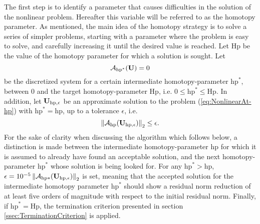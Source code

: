 The first step is to identify a parameter that causes difficulties in the solution of the nonlinear problem. Hereafter this variable will be referred to as the homotopy parameter. 
As mentioned, the main idea of the homotopy strategy is to solve a series of simpler problems, starting with a parameter where the problem is easy to solve, and carefully increasing it until the desired value is reached.  Let  $\mathrm{Hp}$ be the value of the homotopy parameter for which a solution is sought. Let
\begin{equation}
	\mathcal{A}_{\mathrm{hp}^*}(\textbf{U}) = 0
	\label{eq:NonlinearAt-hp}
\end{equation}
be the discretized system for a certain intermediate homotopy-parameter $\mathrm{hp}^*$, between 0 and the target homotopy-parameter $\mathrm{Hp}$, i.e. $0 \leq \mathrm{hp}^* \leq \mathrm{Hp}$.
In addition, let $\textbf{U}_{\mathrm{hp},\epsilon} $ be an approximate solution to the problem (\ref{eq:NonlinearAt-hp}) with $ \mathrm{hp}^* =  \mathrm{hp}$,
up to a tolerance $\epsilon$, i.e. 
\begin{equation}
	\left\| \mathcal{A}_{\mathrm{hp}}( \textbf{U}_{\mathrm{hp},\epsilon} ) \right\|_2 \leq \epsilon .
\end{equation}
For the sake of clarity when discussing the algorithm which follows below, a distinction is made between the intermediate homotopy-parameter $\mathrm{hp}$ for which it is assumed to already have found an acceptable solution, and the next homotopy-parameter $\mathrm{hp}^*$ whose solution is being looked for.
For any $\textrm{hp}^* > \textrm{hp}$, $\epsilon= 10^{-5} \left\| \mathcal{A}_{\mathrm{hp*}}( \textbf{U}_{\mathrm{hp},\epsilon} ) \right\|_2$ is set,
meaning that the accepted solution for the intermediate homotopy parameter $\mathrm{hp}^*$ should show a residual norm reduction of at least five orders of magnitude with respect to the initial residual norm.
Finally, if $\textrm{hp}^* = \textrm{Hp}$, the termination criterion presented in section \ref{ssec:TerminationCriterion} is applied.%
\tikzexternaldisable
